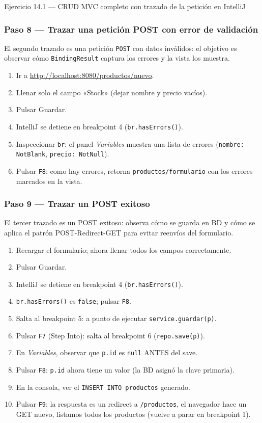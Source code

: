 \begin{cajaejercicio}{Ejercicio 14.1 --- CRUD MVC completo con trazado de la petición en IntelliJ}
\subsubsection*{Paso 8 --- Trazar una petición POST con error de validación}

El segundo trazado es una petición \texttt{POST} con datos
inválidos: el objetivo es observar cómo \texttt{BindingResult}
captura los errores y la vista los muestra.


\begin{enumerate}
\item Ir a \url{http://localhost:8080/productos/nuevo}.
\item Llenar solo el campo «Stock» (dejar nombre y precio vacíos).
\item Pulsar Guardar.
\item IntelliJ se detiene en breakpoint 4 (\texttt{br.hasErrors()}).
\item Inspeccionar \texttt{br}: el panel \emph{Variables} muestra
una lista de errores (\texttt{nombre: NotBlank},
\texttt{precio: NotNull}).
\item Pulsar \texttt{F8}: como hay errores, retorna
\texttt{productos/formulario} con los errores marcados en la vista.
\end{enumerate}

\subsubsection*{Paso 9 --- Trazar un POST exitoso}

El tercer trazado es un POST exitoso: observa cómo se
guarda en BD y cómo se aplica el patrón POST-Redirect-GET para
evitar reenvíos del formulario.


\begin{enumerate}
\item Recargar el formulario; ahora llenar todos los campos
correctamente.
\item Pulsar Guardar.
\item IntelliJ se detiene en breakpoint 4 (\texttt{br.hasErrors()}).
\item \texttt{br.hasErrors()} es \texttt{false}; pulsar \texttt{F8}.
\item Salta al breakpoint 5: a punto de ejecutar
\texttt{service.guardar(p)}.
\item Pulsar \texttt{F7} (Step Into): salta al breakpoint 6
(\texttt{repo.save(p)}).
\item En \emph{Variables}, observar que \texttt{p.id} es \texttt{null}
ANTES del save.
\item Pulsar \texttt{F8}: \texttt{p.id} ahora tiene un valor (la BD
asignó la clave primaria).
\item En la consola, ver el \texttt{INSERT INTO productos} generado.
\item Pulsar \texttt{F9}: la respuesta es un redirect a
\texttt{/productos}, el navegador hace un GET nuevo, listamos
todos los productos (vuelve a parar en breakpoint 1).
\end{enumerate}


\end{cajaejercicio}
